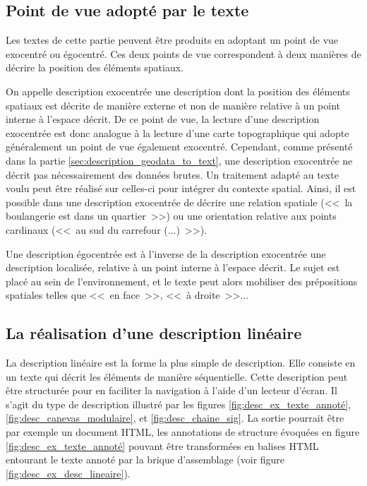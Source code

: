 \subsection{Point de vue adopté par le texte}

Les textes de cette partie peuvent être produits en adoptant un point de vue exocentré ou égocentré. Ces deux points de vue correspondent à deux manières de décrire la position des éléments spatiaux.

\newpar{}

On appelle description exocentrée une description dont la position des éléments spatiaux est décrite de manière externe et non de manière relative à un point interne à l'espace décrit. De ce point de vue, la lecture d'une description exocentrée est donc analogue à la lecture d'une carte topographique qui adopte généralement un point de vue également exocentré. Cependant, comme présenté dans la partie \ref{sec:description_geodata_to_text}, une description exocentrée ne décrit pas nécessairement des données brutes. Un traitement adapté au texte voulu peut être réalisé sur celles-ci pour intégrer du contexte spatial. Ainsi, il est possible dans une description exocentrée de décrire une relation spatiale (<<~la boulangerie est dans un quartier~>>) ou une orientation relative aux points cardinaux (<<~au sud du carrefour (...)~>>).

\newpar{}

Une description égocentrée est à l'inverse de la description exocentrée une description localisée, relative à un point interne à l'espace décrit. Le sujet est placé au sein de l'environnement, et le texte peut alors mobiliser des prépositions spatiales telles que <<~en face~>>, <<~à droite~>>...

\subsection{La réalisation d'une description linéaire}

\label{sec:description_textuelle}

La description linéaire est la forme la plus simple de description. Elle consiste en un texte qui décrit les éléments de manière séquentielle. Cette description peut être structurée pour en faciliter la navigation à l'aide d'un lecteur d'écran. Il s'agit du type de description illustré par les figures \ref{fig:desc_ex_texte_annoté}, \ref{fig:desc_canevas_modulaire}, et \ref{fig:desc_chaine_sig}. La sortie pourrait être par exemple un document HTML, les annotations de structure évoquées en figure \ref{fig:desc_ex_texte_annoté} pouvant être transformées en balises HTML entourant le texte annoté par la brique d'assemblage (voir figure \ref{fig:desc_ex_desc_lineaire}).

